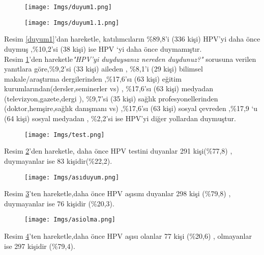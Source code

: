 \documentclass[turkish]{article}
\begin{document}
   \begin{figure}[ht]
    \centering
    \begin{minipage}[b]{0.45\textwidth}
        \centering
        \texttt{[image: Imgs/duyum1.png]}
        \caption{}
        \label{duyum1}
    \end{minipage}
    \hfill
    \begin{minipage}[b]{0.45\textwidth}
        \centering
        \texttt{[image: Imgs/duyum1.1.png]}
        \caption{}
        \label{duyum1.1}
    \end{minipage}
\end{figure}
Resim \ref{duyum1}'dan hareketle, katılımcıların \%89,8’i (336 kişi) HPV’yi daha önce duymuş ,\%10,2’si (38 kişi) ise  HPV ‘yi daha önce duymamıştır.
\\ Resim \ref{duyum1.1}'den hareketle\textit{"HPV'yi duyduysanız nereden duydunuz?"} sorusuna verilen yanıtlara göre,\%9,2’si (33 kişi) aileden , \%8,1’i (29 kişi) bilimsel makale/araştırma dergilerinden ,\%17,6’sı (63 kişi) eğitim kurumlarından(dersler,seminerler vs) , \%17,6’sı (63 kişi) medyadan (televizyon,gazete,dergi ), \%9,7’si (35 kişi) sağlık profesyonellerinden (doktor,hemşire,sağlık danışmanı vs) ,\%17,6’sı (63 kişi) sosyal çevreden ,\%17,9 ‘u (64 kişi) sosyal medyadan , \%2,2’si ise HPV’yi diğer yollardan duymuştur.

   \begin{figure}[ht]
    \centering
    \texttt{[image: Imgs/test.png]}
    \caption{}
    \label{test}
\end{figure}   
Resim \ref{test}'den hareketle, daha önce HPV testini duyanlar 291 kişi(\%77,8) , duymayanlar ise 83 kişidir(\%22,2).

     \begin{figure}[ht]
    \centering
    \texttt{[image: Imgs/asıduyum.png]}
    \caption{}
    \label{asıduyum}
\end{figure}   
Resim \ref{asıduyum}'ten hareketle,daha önce HPV aşısını duyanlar 298 kişi (\%79,8) , duymayanlar ise 76 kişidir (\%20,3).


\clearpage
  \begin{figure}[ht]
    \centering
    \texttt{[image: Imgs/asiolma.png]}
    \caption{}
    \label{asiolma}
\end{figure} 
Resim \ref{asiolma}'ten hareketle,daha önce HPV aşısı olanlar 77 kişi (\%20,6) , olmayanlar ise 297 kişidir (\%79,4).
\end{document}
